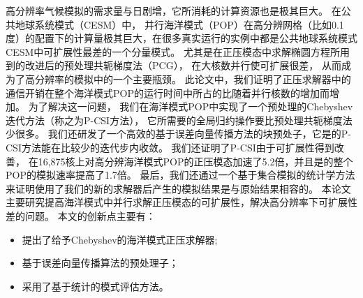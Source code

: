 \begin{cabstract}
高分辨率气候模拟的需求量与日剧增，它所消耗的计算资源也是极其巨大。 
  在公共地球系统模式（CESM）中， 并行海洋模式（POP）在高分辨网格（比如0.1度）的配置下的计算量极其巨大，在很多真实运行的实例中都是公共地球系统模式CESM中可扩展性最差的一个分量模式。 
  尤其是在正压模态中求解椭圆方程所用到的改进后的预处理共轭梯度法（PCG）， 在大核数并行使可扩展很差， 从而成为了高分辨率的模拟中的一个主要瓶颈。 
  此论文中，我们证明了正压求解器中的通信开销在整个海洋模式POP的运行时间中所占的比随着并行核数的增加而增加。 
  为了解决这一问题， 我们在海洋模式POP中实现了一个预处理的Chebyshev迭代方法（称之为P-CSI方法）， 它所需要的全局归约操作要比预处理共轭梯度法少很多。 
  我们还研发了一个高效的基于误差向量传播方法的块预处子，它是的P-CSI方法能在比较少的迭代步内收敛。 
  我们还证明了P-CSI由于可扩展性得到改善， 在16,875核上对高分辨海洋模式POP的正压模态加速了5.2倍，并且是的整个POP的模拟速率提高了1.7倍。 
  最后，我们还通过一个基于集合模拟的统计学方法来证明使用了我们的新的求解器后产生的模拟结果是与原始结果相容的。
本论文主要研究提高海洋模式中并行求解正压模态的可扩展性，解决高分辨率下可扩展性差的问题。 
  本文的创新点主要有：
  \begin{itemize}
    \item 提出了给予Chebyshev的海洋模式正压求解器;
    \item 基于误差向量传播算法的预处理子；
    \item 采用了基于统计的模式评估方法。 
  \end{itemize}

\end{cabstract}


